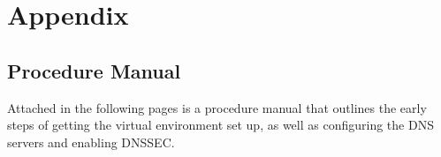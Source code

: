 \appendix

\chapter{Appendix}

\section{Procedure Manual}
Attached in the following pages is a procedure manual that outlines the early steps of getting the virtual environment set up, 
as well as configuring the DNS servers and enabling DNSSEC.


